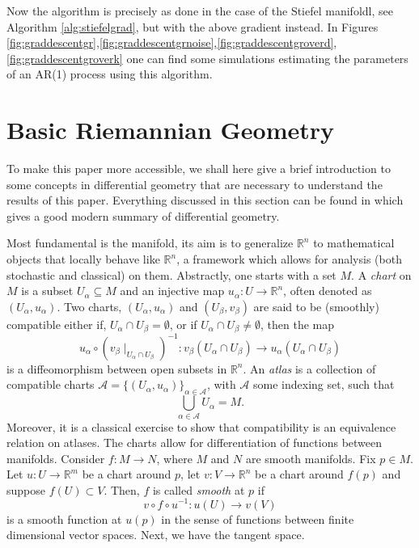 \documentclass[12pt,a4paper]{article}
\theoremstyle{definition}
\theoremstyle{remark}
\begin{document}
Now the algorithm is precisely as done in the case of the Stiefel manifoldl, see Algorithm \ref{alg:stiefelgrad}, but with the above gradient instead. In Figures \ref{fig:graddescentgr},\ref{fig:graddescentgrnoise},\ref{fig:graddescentgroverd},\ref{fig:graddescentgroverk} one can find some simulations estimating the parameters of an AR(1) process using this algorithm.



\appendix



\section{Basic Riemannian Geometry}
\label{sec:basicriemgeom}

To make this paper more accessible, we shall here give a brief introduction to some concepts in differential geometry that are necessary to understand the results of this paper. Everything discussed in this section can be found in \cite{lee2009manifolds} which gives a good modern summary of differential geometry.

Most fundamental is the manifold, its aim is to generalize $\mathbb{R}^n$ to mathematical objects that locally behave like $\mathbb{R}^n$, a framework which allows for analysis (both stochastic and classical) on them. Abstractly, one starts with a set $M$. A \textit{chart} on $M$ is a subset $U_\alpha\subseteq M$ and an injective map $u_{\alpha}:U\rightarrow \mathbb{R}^n$, often denoted as $( U_\alpha,u_\alpha)$. Two charts, $(U_\alpha,u_\alpha)$ and $(U_\beta,v_\beta)$ are said to be (smoothly) compatible either if, $U_\alpha \cap U_\beta = \emptyset$, or if $U_\alpha \cap U_\beta \neq \emptyset$, then the map
\[
u_\alpha \circ (v_\beta\mid_{U_\alpha \cap U_\beta})^{-1} :v_\beta(U_\alpha \cap U_\beta) \rightarrow u_\alpha(U_\alpha \cap U_\beta)
\]
is a diffeomorphism between open subsets in $\mathbb{R}^n$.  An \textit{atlas} is a collection of compatible charts $\mathcal{A}=\{( U_\alpha,u_\alpha)\}_{\alpha \in \mathscr{A}}$, with $\mathscr{A}$ some indexing set, such that
\[
\bigcup_{\alpha \in \mathscr{A}} U_\alpha = M.
\]
Moreover, it is a classical exercise to show that compatibility is an equivalence relation on atlases. The charts allow for differentiation of functions between manifolds. Consider $f:M\rightarrow N$, where $M$ and $N$ are smooth manifolds. Fix $p\in M$. Let $u:U\rightarrow \mathbb{R}^m$ be a chart around $p$, let $v:V\rightarrow \mathbb{R}^n$ be a chart around $f(p)$ and suppose $f(U)\subset V$. Then, $f$ is called \textit{smooth} at $p$ if 
\[
v\circ f \circ u^{-1}:u(U) \rightarrow v(V)
\]
is a smooth function at $u(p)$ in the sense of functions between finite dimensional vector spaces. Next, we have the tangent space.
\end{document}
